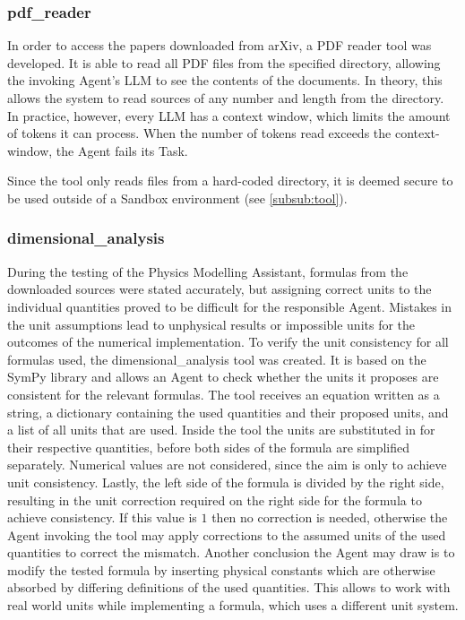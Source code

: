 \documentclass[
	fontsize = 11pt,
	paper = a4,
	draft = false,
	twoside = true,
	titlepage = false
]{scrartcl}
\numberwithin{equation}{subsection}
\begin{document}
	\subsubsection{pdf\_reader} \label{subsub:pdfReader}
	In order to access the papers downloaded from arXiv, a PDF reader tool was developed. It is able to read all PDF files from the specified directory, allowing the invoking \gls{Agent}'s \gls{LLM} to see the contents of the documents. In theory, this allows the system to read sources of any number and length from the directory. In practice, however, every \gls{LLM} has a context window, which limits the amount of \glspl{token} it can process. When the number of \glspl{token} read exceeds the \gls{context-window}, the \gls{Agent} fails its Task.
	
	Since the tool only reads files from a hard-coded directory, it is deemed secure to be used outside of a Sandbox environment (see \autoref{subsub:tool}).
	
	\subsubsection{dimensional\_analysis} \label{subsub:dimAna}
	During the testing of the Physics Modelling Assistant, formulas from the downloaded sources were stated accurately, but assigning correct units to the individual quantities proved to be difficult for the responsible \gls{Agent}. Mistakes in the unit assumptions lead to unphysical results or impossible units for the outcomes of the numerical implementation. To verify the unit consistency for all formulas used, the dimensional\_analysis tool was created. It is based on the SymPy library \autocite{symPy} and allows an \gls{Agent} to check whether the units it proposes are consistent for the relevant formulas. The tool receives an equation written as a string, a dictionary containing the used quantities and their proposed units, and a list of all units that are used. Inside the tool the units are substituted in for their respective quantities, before both sides of the formula are simplified separately. Numerical values are not considered, since the aim is only to achieve unit consistency. Lastly, the left side of the formula is divided by the right side, resulting in the unit correction required on the right side for the formula to achieve consistency. If this value is $1$ then no correction is needed, otherwise the \gls{Agent} invoking the tool may apply corrections to the assumed units of the used quantities to correct the mismatch. Another conclusion the \gls{Agent} may draw is to modify the tested formula by inserting physical constants which are otherwise absorbed by differing definitions of the used quantities. This allows to work with real world units while implementing a formula, which uses a different unit system.
	
\end{document}
